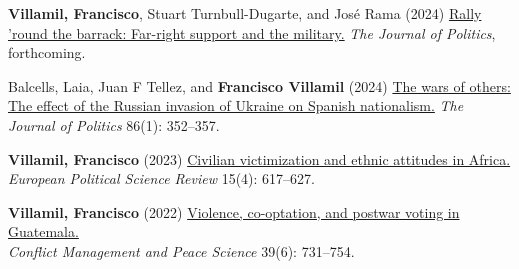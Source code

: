\documentclass[a4paper, 12pt]{article}
\renewcommand\labelitemi{\textbf{--}}
\begin{document}
\begin{etaremune}[leftmargin=12pt, itemsep=0pt]
\item \textbf{Villamil, Francisco}, Stuart Turnbull-Dugarte, and José Rama (2024) \href{https://doi.org/10.1086/727598}{Rally 'round the barrack: Far-right support and the military.} \textit{The Journal of Politics}, forthcoming.
\item Balcells, Laia, Juan F Tellez, and \textbf{Francisco Villamil} (2024) \href{https://doi.org/10.1086/726939}{The wars of others: The effect of the Russian invasion of Ukraine on Spanish nationalism.} \textit{The Journal of Politics} 86(1): 352--357.
\item \textbf{Villamil, Francisco} (2023) \href{https://doi.org/10.1017/S1755773923000097}{Civilian victimization and ethnic attitudes in Africa.}\\\textit{European Political Science Review} 15(4): 617--627.
\item \textbf{Villamil, Francisco} (2022) \href{https://journals.sagepub.com/doi/full/10.1177/07388942211066539}{Violence, co-optation, and postwar voting in Guatemala.}\\\textit{Conflict Management and Peace Science} 39(6): 731--754.

\end{etaremune}
\end{document}
